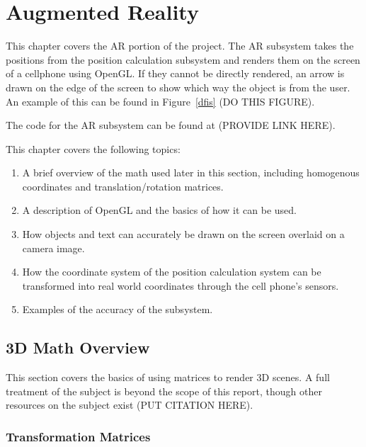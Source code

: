
\chapter{Augmented Reality} %

\label{AugmentedReality}


This chapter covers the AR portion of the project. The AR subsystem takes the positions from the position calculation subsystem and renders them on the screen of a cellphone using OpenGL. If they cannot be directly rendered, an arrow is drawn on the edge of the screen to show which way the object is from the user. An example of this can be found in Figure~\ref{dfis} (DO THIS FIGURE).

The code for the AR subsystem can be found at (PROVIDE LINK HERE).

This chapter covers the following topics:
\begin{enumerate}
	\item A brief overview of the math used later in this section, including homogenous coordinates and translation/rotation matrices.
	\item A description of OpenGL and the basics of how it can be used. 
	\item How objects and text can accurately be drawn on the screen overlaid on a camera image.
	\item How the coordinate system of the position calculation system can be transformed into real world coordinates through the cell phone's sensors.
	\item Examples of the accuracy of the subsystem.
\end{enumerate}

\section{3D Math Overview}
This section covers the basics of using matrices to render 3D scenes. A full treatment of the subject is beyond the scope of this report, though other resources on the subject exist (PUT CITATION HERE).

\subsection{Transformation Matrices}

